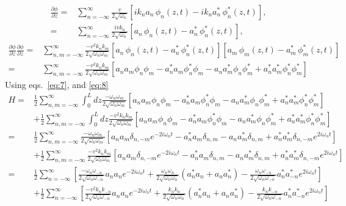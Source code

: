 \begin{frame}
\begin{align}
  \frac{\partial\phi}{\partial z}=&\sum_{n=-\infty}^\infty \frac{v}{2\sqrt{\omega_n}}
  \left[ik_n a_n\,\phi_n(z,t)-ik_n a_n^*\,\phi_n^*(z,t)\right],\nonumber\\
=&\sum_{n=-\infty}^\infty\frac{i vk_n}{2\sqrt{\omega_n}}
  \left[a_n\,\phi_n(z,t)- a_n^*\,\phi_n^*(z,t)\right],
\end{align}
\begin{align}
   \frac{\partial\phi}{\partial z} \frac{\partial\phi}{\partial z}=&
\sum_{n,m=-\infty}^\infty\frac{-v^2 k_nk_m}{2\sqrt{\omega_n\omega_m}}
  \left[a_n\,\phi_n(z,t)- a_n^*\,\phi_n^*(z,t)\right]
\left[a_m\,\phi_m(z,t)- a_m^*\,\phi_m^*(z,t)\right]\\
=  &
\sum_{n,m=-\infty}^\infty\frac{- v^2k_nk_m}{2\sqrt{\omega_n\omega_m}}
  \left[a_n a_m \phi_n \phi_m- a_n^*a_m\phi_n^*\phi_m-a_n a_m^* \phi_n \phi_m^*+ a_n^*a_m^*\phi_n^*\phi_m^*\right]
\end{align}
Using eqs.~\eqref{eq:7}, and \eqref{eq:8}
\begin{align}
  H=  &\frac12
\sum_{n,m=-\infty}^\infty\int_0^Ldz\frac{- \omega_n\omega_m}{2\sqrt{\omega_n\omega_m}} 
  \left[a_n a_m \phi_n \phi_m- a_n^*a_m\phi_n^*\phi_m-a_n a_m^* \phi_n \phi_m^*+ a_n^*a_m^*\phi_n^*\phi_m^*\right]\nonumber\\
&+\frac12\sum_{n,m=-\infty}^\infty\int_0^Ldz \frac{- v^2k_nk_m}{2\sqrt{\omega_n\omega_m}}
  \left[a_n a_m \phi_n \phi_m- a_n^*a_m\phi_n^*\phi_m-a_n a_m^* \phi_n \phi_m^*+ a_n^*a_m^*\phi_n^*\phi_m^*\right]\nonumber\\
  =  &\frac12
\sum_{n,m=-\infty}^\infty\frac{- \omega_n\omega_m}{2\sqrt{\omega_n\omega_m}} 
  \left[a_n a_m \delta_{n,-m}e^{-2i\omega_n t}- a_n^*a_m\delta_{n, m}-a_n a_m^* \delta_{n,m}+ a_n^*a_m^*\delta_{n,-m}e^{2i\omega_n t}\right] \nonumber\\
  &+\frac12
\sum_{n,m=-\infty}^\infty\frac{-v^2 k_nk_m}{2\sqrt{\omega_n\omega_m}} 
  \left[a_n a_m \delta_{n,-m}e^{-2i\omega_n t}- a_n^*a_m\delta_{n, m}-a_n a_m^* \delta_{n,m}+ a_n^*a_m^*\delta_{n,-m}e^{2i\omega_n t}\right]\nonumber\\
  =  &\frac12
\sum_{n=-\infty}^\infty 
  \left[\frac{- \omega_n\omega_{-n}}{2\sqrt{\omega_n\omega_{-n}}}a_n a_n e^{-2i\omega_n t}
+\frac{ \omega_n\omega_n}{2\sqrt{\omega_n\omega_n}}(a_n^*a_n+a_n a_n^*)- \frac{\omega_n\omega_{-n}}{2\sqrt{\omega_n\omega_{-n}}} a_n^*a_{-n}^*e^{2i\omega_n t}\right]\nonumber\\
&+\frac12
\sum_{n=-\infty}^\infty 
  \left[\frac{-v^2 k_nk_{-n}}{2\sqrt{\omega_n\omega_{-n}}}a_n a_n e^{-2i\omega_n t}
+\frac{ k_nk_n}{2\sqrt{\omega_n\omega_n}}(a_n^*a_n+a_n a_n^*)- \frac{k_nk_{-n}}{2\sqrt{\omega_n\omega_{-n}}} a_n^*a_{-n}^*e^{2i\omega_n t}\right]
\end{align}

\end{frame}

